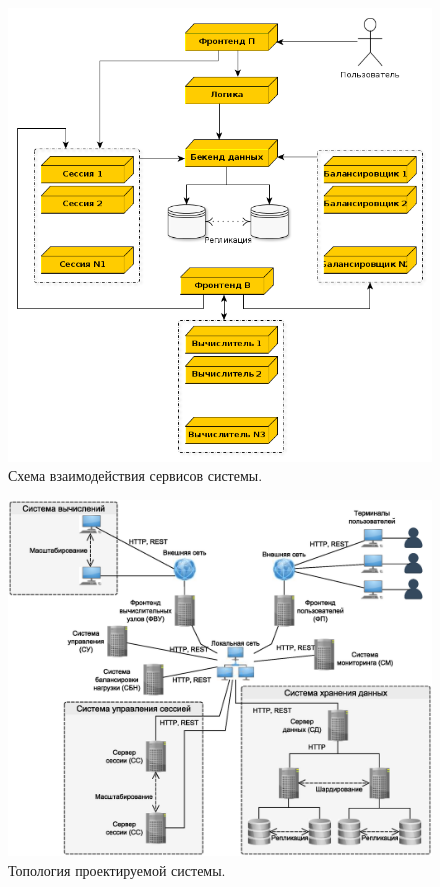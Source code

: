 \documentclass[a4paper,12pt]{report}
\numberwithin{equation}{section}
\begin{document}
\begin{figure}
    \centering
    \includegraphics[width=.8\linewidth]{img/interaction}
    \caption{Схема взаимодействия сервисов системы.}
    \label{fig:interaction}
\end{figure}

\begin{figure}
    \includegraphics[width=\linewidth]{img/topology}
    \caption{Топология проектируемой системы.}
    \label{fig:topology}
\end{figure}
\end{document}
